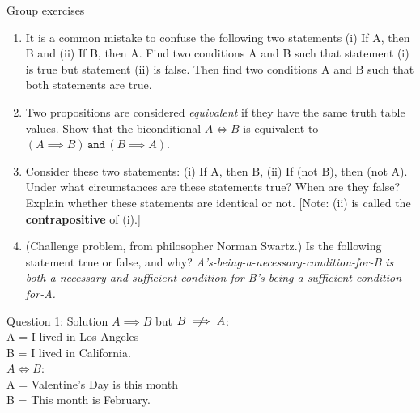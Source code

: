 \documentclass[10pt]{beamer}
\begin{document}
\begin{frame}{Group exercises}
\small 
\begin{enumerate}
	\item It is a common mistake to confuse the following two statements (i) If A, then B and (ii) If B, then A. Find two conditions A and B such that statement (i) is true but statement (ii) is false. Then find two conditions A and B such that both statements are true. 
	\item  Two propositions are considered \textit{equivalent} if they have the same truth table values. Show that the biconditional $A \iff B$ is equivalent to $(A \implies B) \, \texttt{and} \, (B \implies A)$.
	\item Consider these two statements: (i) If A, then B, (ii) If (not B), then (not A).  Under what circumstances are these statements true?  When are they false? Explain whether these statements are identical or not. \alert{[Note: (ii) is called the \textbf{contrapositive} of (i).]}
	\item (Challenge problem, from philosopher Norman Swartz.)  Is the following statement true or false, and why? \textit{A's-being-a-necessary-condition-for-B is both a necessary and sufficient condition for B's-being-a-sufficient-condition-for-A.}
\end{enumerate}
	
\end{frame}


\begin{frame}{Question 1: Solution}
$A \implies B$ but $B \centernot\implies A$: \\
A = I lived in Los Angeles \\
B = I lived in California. \\
\vfill 
$A \iff B$: \\
A = Valentine's Day is this month \\
B = This month is February. 
\end{frame}
\end{document}
